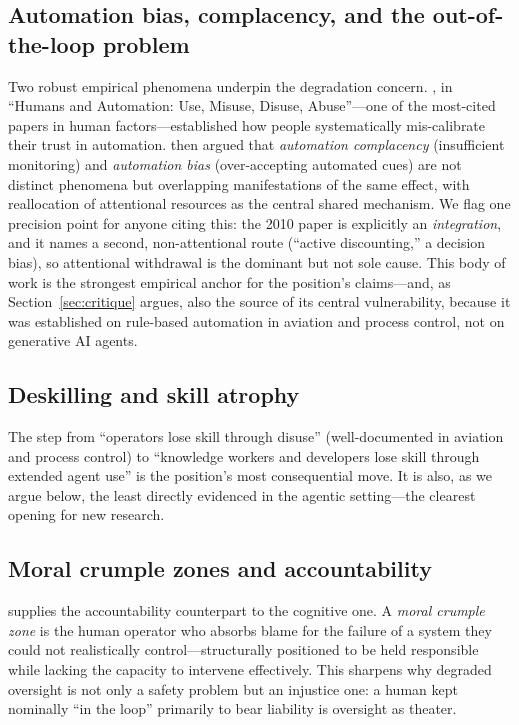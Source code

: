\documentclass[11pt]{article}
\begin{document}
\subsection{Automation bias, complacency, and the out-of-the-loop problem}

Two robust empirical phenomena underpin the degradation concern.
\citet{parasuraman1997}, in ``Humans and Automation: Use, Misuse, Disuse, Abuse''---one of
the most-cited papers in human factors---established how people systematically mis-calibrate
their trust in automation. \citet{parasuraman2010} then argued that \emph{automation
complacency} (insufficient monitoring) and \emph{automation bias} (over-accepting automated
cues) are not distinct phenomena but overlapping manifestations of the same effect, with
reallocation of attentional resources as the central shared mechanism. We flag one
precision point for anyone citing this: the 2010 paper is explicitly an \emph{integration},
and it names a second, non-attentional route (``active discounting,'' a decision bias), so
attentional withdrawal is the dominant but not sole cause. This body of work is the
strongest empirical anchor for the position's claims---and, as Section~\ref{sec:critique}
argues, also the source of its central vulnerability, because it was established on
rule-based automation in aviation and process control, not on generative AI agents.

\subsection{Deskilling and skill atrophy}

The step from ``operators lose skill through disuse'' (well-documented in aviation and
process control) to ``knowledge workers and developers lose skill through extended agent
use'' is the position's most consequential move. It is also, as we argue below, the least
directly evidenced in the agentic setting---the clearest opening for new research.

\subsection{Moral crumple zones and accountability}

\citet{elish2019} supplies the accountability counterpart to the cognitive one. A
\emph{moral crumple zone} is the human operator who absorbs blame for the failure of a
system they could not realistically control---structurally positioned to be held
responsible while lacking the capacity to intervene effectively. This sharpens why
degraded oversight is not only a safety problem but an injustice one: a human kept nominally
``in the loop'' primarily to bear liability is oversight as theater.
\end{document}
